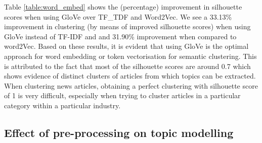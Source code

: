 Table \ref{table:word_embed} shows the (percentage) improvement in silhouette scores when using GloVe over TF\_TDF and Word2Vec. We see a 33.13\% improvement in clustering (by means of improved silhouette scores) when using GloVe instead of TF-IDF and and 31.90\% improvement when compared to word2Vec. Based on these results, it is evident that using GloVe is the optimal approach for word embedding or token vectorisation for semantic clustering. This is attributed to the fact that most of the silhouette scores are around 0.7 which shows evidence of distinct clusters of articles from which topics can be extracted. When clustering news articles, obtaining a perfect clustering with silhouette score of 1 is very difficult, especially when trying to cluster articles in a particular category within a particular industry. 

\subsection{Effect of pre-processing on topic modelling} \label{s:preprocess_topic}

